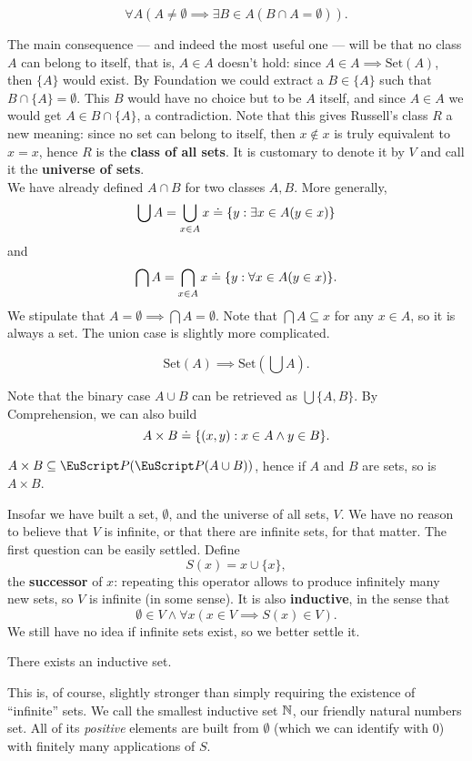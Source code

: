 \documentclass[twoside,openright,titlepage,numbers=noenddot,%
               headinclude,footinclude,cleardoublepage=empty,abstract=on,
               BCOR=23mm,paper=letter,fontsize=11pt
               ]{scrreprt}
\begin{document}
\begin{axiom}[Foundation]
    \[ \forall A (A \neq \emptyset \implies \exists B \in A (B \cap A = \emptyset)). \]
\end{axiom}
The main consequence --- and indeed the most useful one --- will be that no class $A$ can belong to itself, that is, $A \in A$ doesn't hold: since $A \in A \implies \mathrm{Set}(A)$, then $\{A\}$ would exist. By Foundation we could extract a $B \in \{A\}$ such that $B \cap \{A\} = \emptyset$. This $B$ would have no choice but to be $A$ itself, and since $A \in A$ we would get $A \in B \cap \{A\}$, a contradiction. Note that this gives Russell's class $R$ a new meaning: since no set can belong to itself, then $x \notin x$ is truly equivalent to $x = x$, hence $R$ is the \textbf{class of all sets}. It is customary to denote it by $V$ and call it the \textbf{universe of sets}. \\
We have already defined $A \cap B$ for two classes $A,B$. More generally,
\[  \bigcup A = \bigcup_{x \in A} x \hskip1mm\dot{=}\hskip1mm \{ y: \exists x\in A(y \in x) \}\]
and 
\[  \bigcap A = \bigcap_{x \in A} x \hskip1mm\dot{=}\hskip1mm \{ y: \forall x \in A(y \in x) \}. \]
We stipulate that $A = \emptyset \implies \bigcap A = \emptyset$. Note that $\bigcap A \subseteq x$ for any $x \in A$, so it is always a set. The union case is slightly more complicated.
\begin{axiom}[Union]
    \[ \mathrm{Set}(A) \implies \mathrm{Set}\left(\bigcup A\right). \]
\end{axiom}
Note that the binary case $A \cup B$ can be retrieved as $\bigcup \{A,B\}$. By Comprehension, we can also build
\[ A \times B \hskip1mm\dot{=}\hskip1mm \{(x,y): x \in A \land y \in B\}. \]
\begin{remark}
    $A \times B \subseteq \P(\P(A \cup B))$, hence if $A$ and $B$ are sets, so is $A \times B$.
\end{remark}
Insofar we have built a set, $\emptyset$, and the universe of all sets, $V$. We have no reason to believe that $V$ is infinite, or that there are infinite sets, for that matter. The first question can be easily settled. Define 
\[ S(x) = x \cup \{x\}, \]
the \textbf{successor} of $x$: repeating this operator allows to produce infinitely many new sets, so $V$ is infinite (in some sense). It is also \textbf{inductive}, in the sense that
\[ \emptyset \in V \land \forall x (x \in V \implies S(x) \in V). \]
We still have no idea if infinite sets exist, so we better settle it.
\begin{axiom}[Infinity]
    There exists an inductive set.
\end{axiom}
This is, of course, slightly stronger than simply requiring the existence of ``infinite'' sets. We call the smallest inductive set $\mathbb{N}$, our friendly natural numbers set. All of its \textit{positive} elements are built from $\emptyset$ (which we can identify with $0$) with finitely many applications of $S$.
\end{document}
